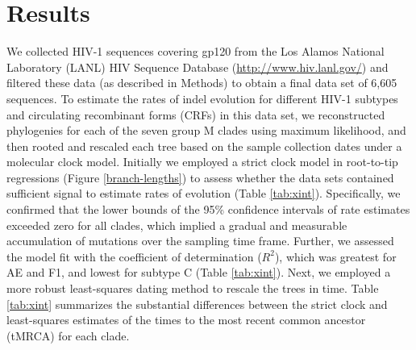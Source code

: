 \documentclass[12pt]{article}
\newcommand{\todo}[2]{\hl{\textbf{#1:} #2}}
\providecommand{\DIFadd}[1]{{\protect\color{blue}\uwave{#1}}} %
\providecommand{\DIFaddbegin}{} %
\providecommand{\DIFaddend}{} %
\newcommand{\DIFaddincludegraphics}[2][]{{\color{blue}\fbox{\DIFOincludegraphics[#1]{#2}}}} %
\DeclareRobustCommand{\DIFaddbegin}{\DIFOaddbegin \let\includegraphics\DIFaddincludegraphics} %
\DeclareRobustCommand{\DIFaddend}{\DIFOaddend \let\includegraphics\DIFOincludegraphics} %
\begin{document}
\DIFaddend \section * {Results}

We collected HIV-1 sequences covering gp120 from the Los Alamos National Laboratory (LANL) HIV Sequence Database (\url{http://www.hiv.lanl.gov/}) and filtered these data (as described in Methods) to obtain a final data set of 6,605 sequences. 
To estimate the rates of indel evolution for different HIV-1 subtypes and circulating recombinant forms (CRFs) in this data set, we reconstructed phylogenies for each of the seven group M clades using maximum likelihood, and then rooted and rescaled each tree based on the sample collection dates under a molecular clock model.
Initially we employed a strict clock model in root-to-tip regressions (Figure \ref{branch-lengths}) to assess whether the data sets contained sufficient signal to estimate rates of evolution (Table \ref{tab:xint}).
Specifically, we confirmed that the lower bounds of the 95\% confidence intervals of rate estimates exceeded zero for all clades, which implied a gradual and measurable accumulation of mutations over the sampling time frame.
Further, we assessed the model fit with the coefficient of determination ($R^2$), which was greatest for \DIFaddbegin \DIFadd{01\_}\DIFaddend AE and F1, and lowest for subtype C (Table \ref{tab:xint}).
Next, we employed a more robust least-squares dating method \citep{To:2015} to rescale the trees in time.  
Table \ref{tab:xint} summarizes the substantial differences between the strict clock and least-squares estimates of the times to the most recent common ancestor (tMRCA) for each clade.
\end{document}
